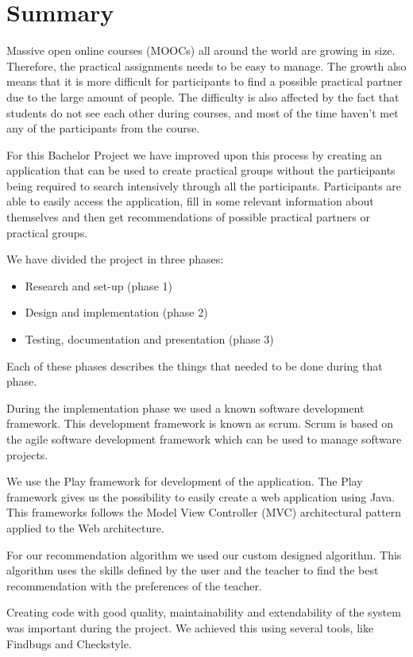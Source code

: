 \chapter*{Summary}

Massive open online courses (MOOCs) all around the world are growing in size. 
Therefore, the practical assignments needs to be easy to manage.
The growth also means that it is more difficult for participants to find a possible practical partner due to the large amount of people.
The difficulty is also affected by the fact that students do not see each other during courses, and most of the time haven't met any of the participants from the course.

For this Bachelor Project we have improved upon this process by creating an application that can be used to create practical groups without the participants being required to search intensively through all the participants.
Participants are able to easily access the application, fill in some relevant information about themselves and then get recommendations of possible practical partners or practical groups.

We have divided the project in three phases:
\begin{itemize}
\item Research and set-up (phase 1)
\item Design and implementation (phase 2)
\item Testing, documentation and presentation (phase 3)
\end{itemize}
Each of these phases describes the things that needed to be done during that phase.

During the implementation phase we used a known software development framework.
This development framework is known as scrum.
Scrum is based on the agile software development framework which can be used to 
manage software projects.

We use the Play framework for development of the application. 
The Play framework gives us the possibility to easily create a web application using Java.
This frameworks follows the Model View Controller (MVC) architectural pattern applied to the Web architecture.

For our recommendation algorithm we used our custom designed algorithm.
This algorithm uses the skills defined by the user and the teacher to find the best recommendation with the preferences of the teacher.

Creating code with good quality, maintainability and extendability of the system was important during the project.
We achieved this using several tools, like Findbugs and Checkstyle.

